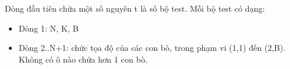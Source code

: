 Dòng đầu tiên chứa một số nguyên t là số bộ test. Mỗi bộ test có dạng:  
\begin{itemize}
	\item     Dòng 1: N, K, B   
	\item     Dòng 2..N+1: chức tọa độ của các con bò, trong phạm vi (1,1) đến (2,B). Không có ô nào chứa hơn 1 con bò.   
\end{itemize}

\